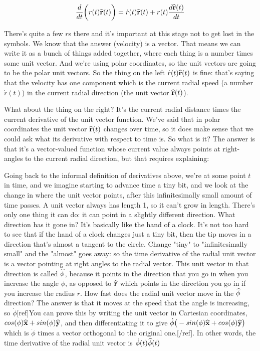 \begin{align*}
\frac{d}{dt}\bigg(r(t)\mathbf{\widehat{r}}(t)\bigg) = \dot r(t) \mathbf{\widehat{r}}(t) + r(t)\frac{d \mathbf{\widehat{r}}(t)}{dt}
\end{align*}

There's quite a few $r$s there and it's important at this stage not to get lost in the symbols. We
know that the answer (velocity) is a vector. That means we can write it as a bunch of things added
together, where each thing is a number times some unit vector. And we're using polar coordinates, so
the unit vectors are going to be the polar unit vectors. So the thing on the left
$\dot r(t) \mathbf{\widehat{r}}(t)$ is fine: that's saying that the velocity has one component which is the current
radial speed (a number $\dot r(t)$) in the current radial direction (the unit vector $\mathbf{\widehat{r}}(t)$).

What about the thing on the right? It's the current radial distance times the
current derivative of the unit vector function. We've said that in polar
coordinates the unit vector $\mathbf{\widehat{r}}(t)$ changes over time, so it does make sense
that we could ask what its derivative with respect to time is. So what is it?
The answer is that it's a vector-valued function whose current value always
points at right-angles to the current radial direction, but that requires
explaining:

Going back to the informal definition of derivatives above, we're at some point
$t$ in time, and we imagine starting to advance time a tiny bit, and we look at
the change in where the unit vector points, after this infinitesimally small
amount of time passes. A unit vector always has length 1, so it can't grow in
length. There's only one thing it can do: it can point in a slightly different
direction. What direction has it gone in? It's basically like the hand of a
clock. It's not too hard to see that if the hand of a clock changes just a tiny
bit, then the tip moves in a direction that's almost a tangent to the
circle. Change "tiny" to "infinitesimally small" and the "almost" goes away: so
the time derivative of the radial unit vector is a vector pointing at right
angles to the radial vector. This unit vector in that direction is called
$\mathbf{\widehat{\phi}}$, because it points in the direction that you go in when you increase
the angle $\phi$, as opposed to $\mathbf{\widehat{r}}$ which points in the direction you go in
if you increase the radius $r$. How fast does the radial unit vector move in
the $\mathbf{\widehat{\phi}}$ direction? The answer is that it moves at the speed that the
angle is increasing, so $\dot \phi$[ref]You can prove this by writing the unit
vector in Cartesian coordinates, $cos(\phi) \mathbf{\widehat{x}} + sin(\phi) \mathbf{\widehat{y}}$, and then
differentiating it to give $\dot \phi\big(-sin(\phi)\mathbf{\widehat{x}} +
cos(\phi)\mathbf{\widehat{y}}\big)$ which is $\dot \phi$ times a vector orthogonal to the
original one.[/ref]. In other words, the time derivative of the radial unit
vector is $\dot \phi(t) \mathbf{\widehat{\phi}}(t)$

